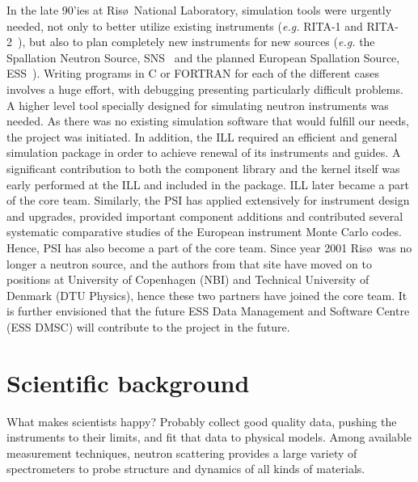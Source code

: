 In the late 90'ies at Ris\o\ National Laboratory,
simulation tools were urgently needed,
not only to better utilize existing instruments
({\em e.g.} RITA-1 and RITA-2~\cite{cjp_73_697,pb_241_50,pb_283_343}),
but also to plan completely new instruments for new sources
({\em e.g.} the Spallation Neutron Source, SNS~\cite{sns_webpage}
and the planned European Spallation Source, ESS~\cite{ess_webpage}).
Writing programs in C or FORTRAN for
each of the different cases involves a huge effort, with debugging presenting
particularly difficult problems. A higher level tool specially designed
for simulating neutron instruments was needed. As there was
no existing simulation software that would fulfill our needs, the \MCS
project was initiated.
In addition, the ILL required an efficient and general simulation
package in order to achieve renewal of its instruments and guides.
A significant contribution to both the component library and the \MCS
kernel itself was early performed at the ILL and included in the package.
ILL later became a part of the core \MCS team.
Similarly, the PSI has applied \MCS extensively for instrument design
and upgrades, provided important component additions and contributed
several systematic comparative studies of the European instrument
Monte Carlo codes. Hence, PSI has also become a part of the core \MCS
team.
Since year 2001 Ris\o\ was no longer a neutron source, and the authors
from that site have moved on to positions at University of Copenhagen
(NBI) and Technical University of Denmark (DTU Physics), hence these
two partners have joined the core \MCS team.
It is further envisioned that the future ESS Data Management and
Software Centre (ESS DMSC) will contribute to the project in the future.

\section{Scientific background}
What makes scientists happy? Probably collect good quality data, pushing the instruments to their limits, and fit that data to physical models.
Among available measurement techniques, neutron scattering provides a
large variety of spectrometers to probe structure and dynamics of all
kinds of materials.

